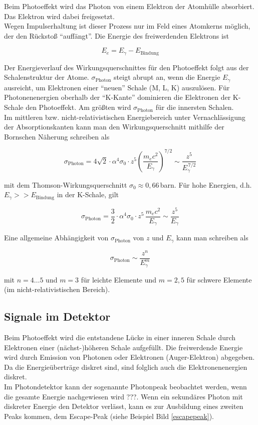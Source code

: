 Beim Photoeffekt wird das Photon von einem Elektron der Atomhülle absorbiert. Das Elektron wird
dabei freigesetzt.
\\
Wegen Impulserhaltung ist dieser Prozess nur im Feld eines Atomkerns möglich, der den Rückstoß 
"`auffängt"'. Die Energie des freiwerdenden Elektrons ist

\[ E_e=E_\gamma - E_{\text{Bindung}} \]

Der Energieverlauf des Wirkungsquerschnittes für den Photoeffekt folgt aus der Schalenstruktur der
Atome. $\sigma_\text{Photon}$ steigt abrupt an, wenn die Energie $E_\gamma$ ausreicht, um Elektronen
einer "`neuen"' Schale (M, L, K) auszulösen. Für Photonenenergien oberhalb der "`K-Kante"'
dominieren die Elektronen der K-Schale den Photoeffekt. Am größten wird $\sigma_\text{Photon}$ für
die innersten Schalen.
\\
Im mittleren bzw. nicht-relativistischen Energiebereich unter Vernachlässigung der Absorptionskanten
kann man den Wirkungsquerschnitt mithilfe der Bornschen Näherung schreiben als

\[ \sigma_\text{Photon} = 4\sqrt{2} \cdot \alpha^4 \sigma_0 \cdot z^5 \left(\frac{m_ec^2}{E_\gamma}
\right)^{7/2} \sim \frac{z^5}{E_\gamma^{\,7/2}} \]

mit dem Thomson-Wirkungsquerschnitt $\sigma_0\approx 0{,}66\,$barn. Für hohe Energien, d.h.
$E_\gamma>>E_{\text{Bindung}}$ in der K-Schale, gilt

\[\sigma_\text{Photon} = \frac{3}{2} \cdot \alpha^4 \sigma_0 \cdot z^5\, \frac{m_ec^2}{E_\gamma}
\sim \frac{z^5}{E_\gamma} \]

Eine allgemeine Abhängigkeit von $\sigma_\text{Photon}$ von $z$ und $E_\gamma$ kann man schreiben
als

\[ \sigma_\text{Photon} \sim \frac{z^n}{E_\gamma^m} \]

mit $n=4\ldots5$ und $m=3$ für leichte Elemente und $m=2{,}5$ für schwere Elemente (im
nicht-relativistischen Bereich).

\subsection*{Signale im Detektor}

Beim Photoeffekt wird die entstandene Lücke in einer inneren Schale durch Elektronen einer
(nächst-)höheren Schale aufgefüllt. Die freiwerdende Energie wird durch Emission von Photonen oder
Elektronen (Auger-Elektron) abgegeben. Da die Energieüberträge diskret sind, sind folglich auch die
Elektronenenergien diskret. 
\\
Im Photondetektor kann der sogenannte Photonpeak beobachtet werden, wenn die gesamte Energie
nachgewiesen wird ???.  Wenn ein sekundäres Photon mit diskreter Energie den Detektor verlässt, kann
es zur Ausbildung eines zweiten Peaks kommen, dem Escape-Peak (siehe Beispiel Bild
\ref{escapepeak}).

